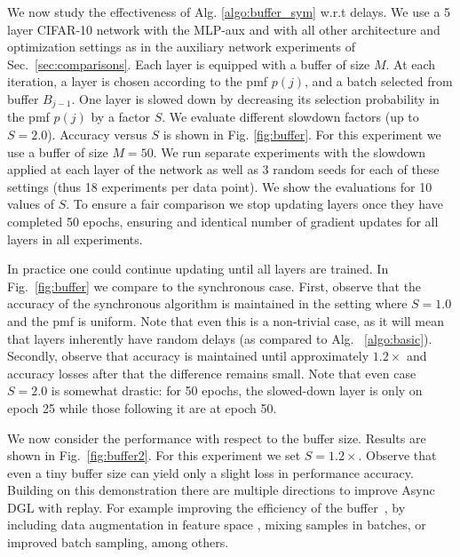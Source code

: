 \documentclass{article}
\begin{document}
We now study the effectiveness of
Alg. \ref{algo:buffer_sym} w.r.t delays. We use a 5 layer CIFAR-10 network with the MLP-aux and with all other architecture and optimization settings as in the auxiliary network experiments of Sec.~\ref{sec:comparisons}.  
Each layer is equipped with a buffer of size $M$.
At each iteration, a layer is chosen according to the pmf $p(j)$, and a batch selected from buffer $B_{j-1}$.
One layer is slowed down by decreasing its selection probability in the pmf $p(j)$ by a factor $S$.
We evaluate
different slowdown factors (up to $S=2.0$). Accuracy versus $S$ is
shown in Fig. \ref{fig:buffer}. For this experiment we use a buffer of size $M=50$. We run separate experiments with the slowdown applied at each layer of the network as well as 3 
random
seeds for each of these settings (thus 18 experiments per data point). We show the evaluations for 10 values of $S$.
To ensure 
a fair comparison we stop updating layers once they have completed 50 epochs, ensuring and identical number of gradient updates for all layers in all experiments. 


In practice one could continue updating until all layers are trained. In Fig.~\ref{fig:buffer} we compare to the synchronous case. First, observe that the accuracy of the synchronous algorithm is maintained in the setting where $S=1.0$ and the pmf is uniform. Note that even this is a non-trivial case, as it will mean that layers inherently have random delays (as compared to  Alg. ~\ref{algo:basic}). Secondly, observe that accuracy is maintained until approximately $1.2\times$ and accuracy losses after that the difference remains small.
Note that even case $S=2.0$ is somewhat drastic: for 50 epochs, the slowed-down layer is only on epoch 25 while those following it are at epoch 50. 


We now consider the
performance with respect to the buffer size. Results are shown in Fig.~\ref{fig:buffer2}. For this experiment we set $S=1.2\times$. Observe that even a tiny buffer size can yield only a slight loss in performance accuracy. Building on this demonstration there are multiple directions to improve Async DGL with replay.
For example improving the efficiency of the buffer~\cite{oyallon2018compressing}, by including data augmentation in feature space \citep{verma2018manifold}, mixing samples in batches, or improved batch sampling, among others. 
\vspace{-8pt}
\end{document}
